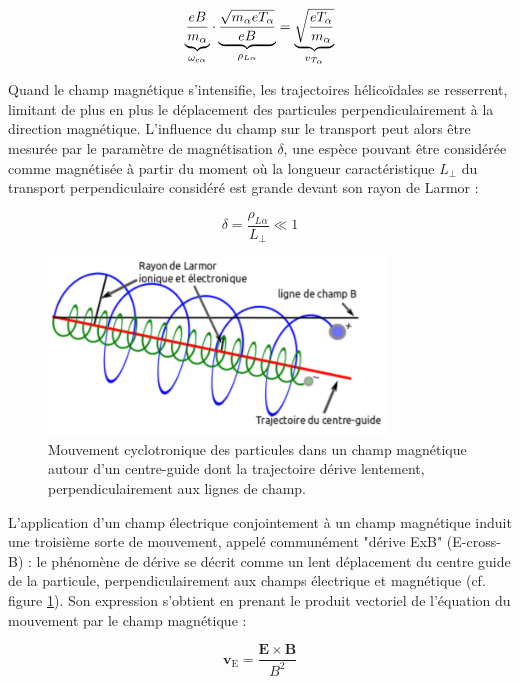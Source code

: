 \begin{refsection}
\begin{equation}
\underbrace{\frac{e B}{m_\alpha}}_{\omega_{c\alpha}}
\cdot\underbrace{\frac{\sqrt{m_\alpha eT_\alpha}}{eB}}_{\rho_{L\alpha}}
=\underbrace{\sqrt{\frac{eT_{\alpha}}{m_{\alpha}}}}_{v{_{T_{\alpha}}}}
\end{equation}

Quand le champ magnétique s'intensifie, les trajectoires
hélicoïdales se resserrent, limitant de plus en plus le déplacement des
particules perpendiculairement à la direction magnétique. L'influence du champ
sur le transport peut alors être mesurée par le paramètre de
magnétisation $\delta$, une espèce pouvant être considérée comme magnétisée à
partir du moment où la longueur caractéristique $L_\perp$ du transport
perpendiculaire considéré est grande devant son rayon de Larmor :

\begin{equation}
\delta=\frac{\rho_{L\alpha}}{L_\perp}\ll 1
\end{equation}

\begin{figure}[htbp]
\centering
\includegraphics[width=0.8\textwidth]{figures/1-mouvementCyclotron.png}
{\caption{Mouvement cyclotronique des particules dans un champ magnétique autour
d'un centre-guide dont la trajectoire dérive lentement, perpendiculairement aux
lignes de champ.}\label{1-particleDrifts}}
\end{figure}

L'application d'un champ électrique conjointement à un champ magnétique
induit une troisième sorte de mouvement, appelé communément "dérive
ExB" (E-cross-B) : le phénomène de dérive se décrit comme un lent déplacement du
centre guide de la particule, perpendiculairement aux champs électrique et
magnétique (cf. figure \ref{1-particleDrifts}). Son expression s'obtient en
prenant le produit vectoriel de l'équation du mouvement par le champ magnétique
:

\begin{equation}
\mathbf{v}_\text{E}=\frac{\mathbf{E}\times\mathbf{B}}{B^2}
\end{equation}


\end{refsection}
